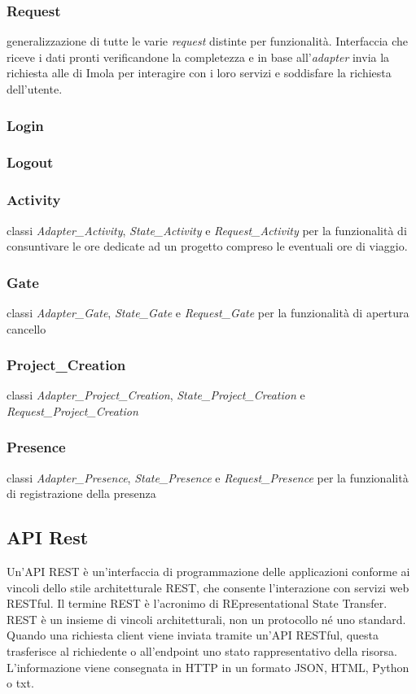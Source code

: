 \subsubsection{Request} generalizzazione di tutte le varie \textit{request} distinte per funzionalità. Interfaccia che riceve i dati pronti verificandone la completezza e in base all'\textit{adapter} invia la richiesta  alle  di Imola per interagire con i loro servizi e soddisfare la richiesta dell'utente.
\subsubsection{Login}
\subsubsection{Logout}
\subsubsection{Activity} classi \textit{Adapter\_Activity}, \textit{State\_Activity} e \textit{Request\_Activity} per la funzionalità di consuntivare le ore dedicate ad un progetto compreso le eventuali ore di viaggio.
\subsubsection{Gate} classi \textit{Adapter\_Gate}, \textit{State\_Gate} e \textit{Request\_Gate} per la funzionalità di apertura cancello
\subsubsection{Project\_Creation} classi \textit{Adapter\_Project\_Creation}, \textit{State\_Project\_Creation} e \textit{Request\_Project\_Creation}
\subsubsection{Presence} classi \textit{Adapter\_Presence}, \textit{State\_Presence} e \textit{Request\_Presence} per la funzionalità di registrazione della presenza

\subsection{API Rest}
Un'API REST è un'interfaccia di programmazione delle applicazioni conforme ai vincoli dello stile architetturale REST, che consente l'interazione con servizi web RESTful.\newline 
Il termine REST è l'acronimo di REpresentational State Transfer. REST è un insieme di vincoli architetturali, non un protocollo né uno standard.
Quando una richiesta client viene inviata tramite un'API RESTful, questa trasferisce al richiedente o all'endpoint uno stato rappresentativo della risorsa. L'informazione viene consegnata in HTTP in un formato JSON, HTML, Python o txt.
\newpage